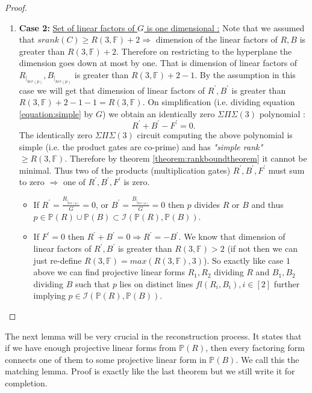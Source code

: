 \documentclass[12pt]{caltech_thesis}
\theoremstyle{plain}
\theoremstyle{definition}
\newcommand{\F}{\mathbb{F}}
\newcommand{\MI}{\mathcal{I}}
\newcommand{\PP}{\mathbb{P}}
\begin{document}
\begin{proof}
\begin{enumerate}
 \item \textbf{Case 2:} \underline{Set of   linear factors of $G$ is one dimensional :} 
 Note that we assumed that $srank(C) \geq R(3,\F) + 2 \Rightarrow$ dimension of the linear factors of $R,B$ is 
 greater than $R(3,\F)+2$. Therefore on restricting to the hyperplane the dimension goes down at most by one. That is
 dimension of linear factors of $R_{|_{ker(p)}}, B_{|_{ker(p)}}$ is greater than $R(3,\F)+2-1$. 
 By the assumption in this case we will get that dimension of linear factors of
 $R^\prime,B^\prime$ is greater than $R(3,\F)+2-1-1
 =R(3,\F)$. On simplification (i.e. dividing equation \ref{equation:simple} by $G$) we obtain an 
 identically zero $\Sigma\Pi\Sigma(3)$ polynomial :
\[
 R^\prime + B^\prime - F^\prime = 0.
 \]
 The identically zero $\Sigma\Pi\Sigma(3)$ circuit computing the above polynomial is simple (i.e. the product gates are co-prime) and has 
 \emph{"simple rank"} $\geq R(3,\F)$. Therefore by theorem \ref{theorem:rankboundtheorem} it cannot be minimal.
 Thus two of the products (multiplication
 gates) $R^\prime,B^\prime,F^\prime$ must sum to zero $\Rightarrow$ one of $R^\prime,B^\prime,F^\prime$ is zero.
 \begin{itemize}
  \item If $R^\prime =\frac{R_{|_{ker(p)}}}{G} = 0$, or $B^\prime =\frac{B_{|_{ker(p)}}}{G} = 0$ then $p$ divides 
  $R$ or $B$ and thus $p\in \PP(R)\cup\PP(B)\subset \MI(\PP(R),\PP(B))$.
 \item If $F^\prime=0$ then $R^\prime+B^\prime=0 \Rightarrow R^\prime = -B^\prime$. 
 We know that dimension of linear factors of $R^\prime,B^\prime$ is greater than $R(3,\F)>2$ (if not then we can just re-define $R(3,\F) = 
 max(R(3,\F),3)$).  
 So exactly like case $1$ above we can find   projective linear forms $R_1,R_2$ dividing $R$ and $B_1,B_2$ dividing $B$ such that $p$ lies on 
 distinct lines $fl(R_i,B_i), i\in [2]$ further implying $p\in \MI(\PP(R),\PP(B))$.
 \end{itemize}

 \end{enumerate}


\end{proof}
The next lemma will be very crucial in the reconstruction process. It states that if we have enough projective linear forms from $\PP(R)$, then
every factoring form connects one of them to some projective linear form in $\PP(B)$. We call this the matching lemma. Proof is exactly like the 
last theorem but we still write it for completion.
\end{document}
